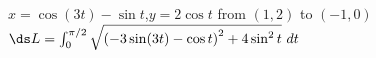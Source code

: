 {$x=\cos(3t)-\sin t$,\quad  $y=2\cos t$ from $(1,2)$ to $(-1,0)$}
{$\ds L=\int_0^{\pi/2} \sqrt{\left(-3\sin(3t)-\cos t\right)^2+4\sin^2 t}\ dt$ }
